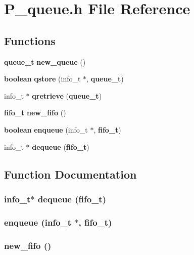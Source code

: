 \section{P\_\-queue.h File Reference}
\label{P__queue_8h}
\subsection*{Functions}
\begin{CompactItemize}
\item 
{\bf queue\_\-t} {\bf new\_\-queue} ()
\item 
{\bf boolean} {\bf qstore} (info\_\-t $\ast$, {\bf queue\_\-t})
\item 
info\_\-t $\ast$ {\bf qretrieve} ({\bf queue\_\-t})
\item 
{\bf fifo\_\-t} {\bf new\_\-fifo} ()
\item 
{\bf boolean} {\bf enqueue} (info\_\-t $\ast$, {\bf fifo\_\-t})
\item 
info\_\-t $\ast$ {\bf dequeue} ({\bf fifo\_\-t})
\end{CompactItemize}


\subsection{Function Documentation}
\subsubsection{\setlength{\rightskip}{0pt plus 5cm}info\_\-t$\ast$ dequeue ({\bf fifo\_\-t})}\label{P__queue_8h_a5}


\subsubsection{ enqueue (info\_\-t $\ast$, {\bf fifo\_\-t})}\label{P__queue_8h_a4}


\subsubsection{ new\_\-fifo ()}\label{P__queue_8h_a3}


